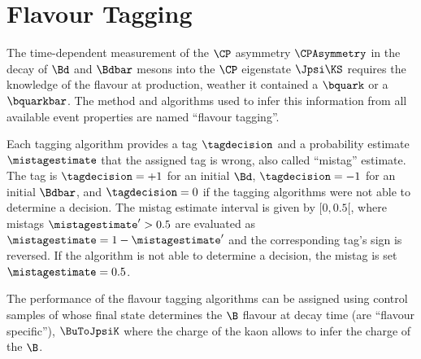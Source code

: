 
\chapter{Flavour Tagging}
\label{ch:flavour_tagging}

The time-dependent measurement of the $\CP$ asymmetry $\CPAsymmetry$ in the
decay of $\Bd$ and $\Bdbar$ mesons into the $\CP$ eigenstate $\Jpsi\KS$ requires
the knowledge of the \Bmeson flavour at production, \ie weather it contained
a $\bquark$ or a $\bquarkbar$. The method and algorithms used to infer this
information from all available event properties are named \enquote{flavour
tagging}.

Each tagging algorithm provides a tag $\tagdecision$ and a probability estimate
$\mistagestimate$ that the assigned tag is wrong, also called \enquote{mistag}
estimate. The tag is $\tagdecision=+1$ for an initial $\Bd$, $\tagdecision=-1$
for an initial $\Bdbar$, and $\tagdecision=0$ if the tagging algorithms were not
able to determine a decision. The mistag estimate interval is given by
$[0,0.5[$, where mistags $\mistagestimate^{\prime}>0.5$ are evaluated as
$\mistagestimate = 1 - \mistagestimate^{\prime}$ and the corresponding tag's
sign is reversed. If the algorithm is not able to determine a decision, the
mistag is set $\mistagestimate=0.5$.

The performance of the flavour tagging algorithms can be assigned using control
samples of \Bmesons whose final state determines the $\B$ flavour at decay
time (\ie are \enquote{flavour specific}), \eg $\BuToJpsiK$ where the charge of
the kaon allows to infer the charge of the $\B$.

